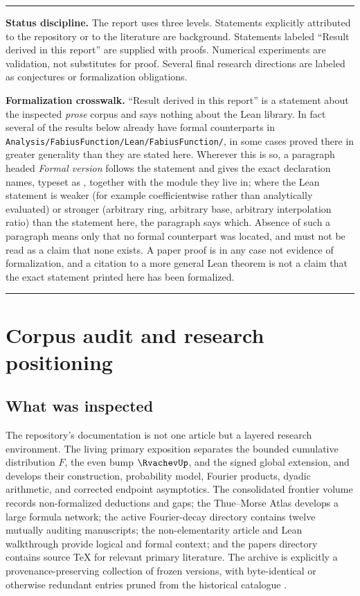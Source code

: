 \documentclass[11pt,oneside]{article}
\numberwithin{equation}{section}
\theoremstyle{definition}
\theoremstyle{remark}
\newenvironment{boxedremark}{%
  \par\smallskip\noindent\begin{center}\begin{minipage}{0.94\textwidth}%
  \color{black}\hrule\vspace{0.6em}\small
}{%
  \vspace{0.6em}\hrule\end{minipage}\end{center}\smallskip
}
\begin{document}
\begin{boxedremark}
\textbf{Status discipline.}
The report uses three levels.  Statements explicitly attributed to the repository or to the
literature are background.  Statements labeled ``Result derived in this report'' are supplied
with proofs.  Numerical experiments are validation, not substitutes for proof.  Several final
research directions are labeled as conjectures or formalization obligations.

\smallskip
\textbf{Formalization crosswalk.}
``Result derived in this report'' is a statement about the inspected \emph{prose} corpus and
says nothing about the Lean library.  In fact several of the results below already have formal
counterparts in \nolinkurl{Analysis/FabiusFunction/Lean/FabiusFunction/}, in some cases proved
there in greater generality than they are stated here.  Wherever this is so, a paragraph
headed \emph{Formal version} follows the statement and gives the exact declaration names,
typeset as , together with the module they live in; where the Lean
statement is weaker (for example coefficientwise rather than analytically evaluated) or stronger
(arbitrary ring, arbitrary base, arbitrary interpolation ratio) than the statement here, the
paragraph says which.  Absence of such a paragraph means only that no formal counterpart was
located, and must not be read as a claim that none exists.  A paper proof is in any case not
evidence of formalization, and a citation to a more general Lean theorem is not a claim that
the exact statement printed here has been formalized.
\end{boxedremark}


\clearpage

\section{Corpus audit and research positioning}
\label{p2:sec:audit}

\subsection{What was inspected}

The repository's documentation is not one article but a layered research environment.  The
living primary exposition separates the bounded cumulative distribution $F$, the even bump
$\RvachevUp$, and the signed global extension, and develops their construction, probability model,
Fourier products, dyadic arithmetic, and corrected endpoint asymptotics.  The consolidated
frontier volume records non-formalized deductions and gaps; the Thue--Morse Atlas develops a
large formula network; the active Fourier-decay directory contains twelve mutually auditing
manuscripts; the non-elementarity article and Lean walkthrough provide logical and formal
context; and the papers directory contains source TeX for relevant primary literature.
The archive is explicitly a provenance-preserving collection of frozen versions, with
byte-identical or otherwise redundant entries pruned from the historical catalogue
\cite{p2:proveit-primary,p2:proveit-frontiers,p2:proveit-atlas,p2:proveit-fourier,p2:proveit-archive}.
\end{document}
